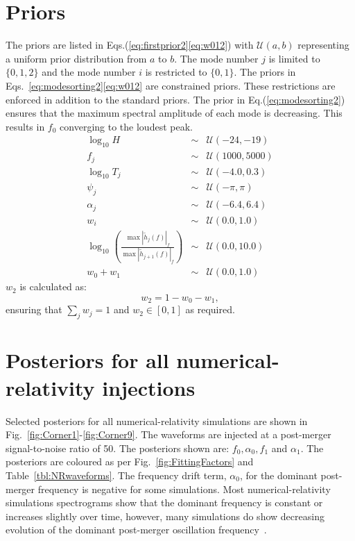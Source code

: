 \documentclass[../Thesis.tex]{subfiles}
\begin{document}
\begin{subappendices}
\section{Priors}
\label{appendix:b2}
    The priors are listed in Eqs.(\ref{eq:firstprior2}\Hyphdash*\ref{eq:w012}) with $\mathcal{U}(a,b)$ representing a uniform prior distribution from $a$ to $b$. 
    The mode number $j$ is limited to $\lbrace 0,1,2 \rbrace$ and the mode number $i$ is restricted to $\lbrace 0,1 \rbrace$. 
    The priors in Eqs.~\ref{eq:modesorting2}\Hyphdash*\ref{eq:w012} are constrained priors. 
    These restrictions are enforced in addition to the standard priors. The prior in Eq.(\ref{eq:modesorting2}) ensures that the maximum spectral amplitude of each mode is decreasing. 
    This results in $f_0$ converging to the loudest peak. 
    \begin{eqnarray}
        \log_{10}{H} & \sim & \mathcal{U}(-24, -19)\label{eq:firstprior2}  \\
        f_j & \sim & \mathcal{U}(1000,5000) \\
        \log_{10}T_j & \sim & \mathcal{U}(-4.0,0.3)\\
        \psi_j & \sim & \mathcal{U}(-\pi,\pi) \\
        \alpha_j & \sim & \mathcal{U}(-6.4,6.4) \\
        w_i & \sim & \mathcal{U}(0.0,1.0)\label{eq:lastprior2}\\
        \log_{10}\left(\frac{\max|\tilde{h}_{j}(f)|_f}
        {\max|\tilde{h}_{j+1}(f)|_f}\right) & \sim & \mathcal{U}(0.0,10.0)\label{eq:modesorting2} \\
        w_0+w_1 & \sim & \mathcal{U}(0.0,1.0) \label{eq:w012}
    \end{eqnarray}
    $w_2$ is calculated as:
    \begin{equation}
        w_2 = 1 - w_0 - w_1,\label{eq:w0122}
    \end{equation}
    ensuring that $\sum_j w_j = 1$ and $w_2\in[0,1]$ as required. 
\section{Posteriors for all numerical-relativity injections}
\label{appendix:c2}  
Selected posteriors for all numerical-relativity simulations are shown in Fig.~\ref{fig:Corner1}-\ref{fig:Corner9}. 
The waveforms are injected at a post-merger signal-to-noise ratio of 50.
The posteriors shown are: $f_0, \alpha_0, f_1$ and $\alpha_1$. 
The posteriors are coloured as per Fig.~\ref{fig:FittingFactors} and Table~\ref{tbl:NRwaveforms}. 
The frequency drift term, $\alpha_0$, for the dominant post-merger frequency is negative for some simulations.
Most numerical-relativity simulations spectrograms show that the dominant frequency is constant or increases slightly over time, however, many simulations do show decreasing evolution of the dominant post-merger oscillation frequency~\cite[e.g.,][]{Foucart2016,Radice2017a,Dietrich2019b}.


\end{subappendices}
\end{document}
